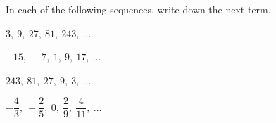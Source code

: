  In each of the following sequences, write down the next term.

\begin{subparts}
  \item $3,\ 9,\ 27,\ 81,\ 243,\ \ldots$
  \item $-15,\ -7,\ 1,\ 9,\ 17,\ \ldots$
  \item $243,\ 81,\ 27,\ 9,\ 3,\ \ldots$
  \item $-\dfrac{4}{3},\ -\dfrac{2}{5},\ 0,\ \dfrac{2}{9},\ \dfrac{4}{11},\ \ldots$
\end{subparts}

